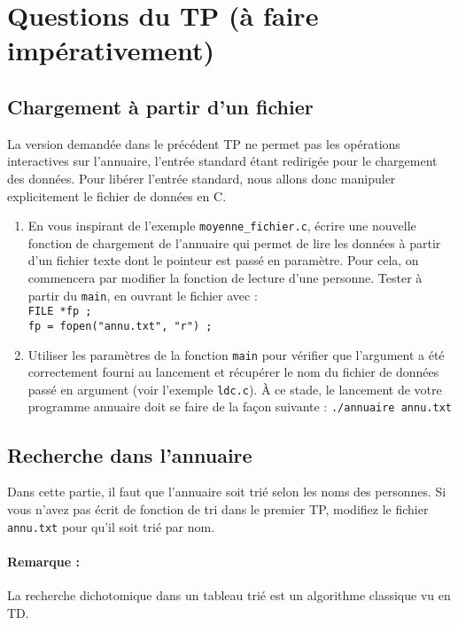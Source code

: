 \documentclass[final, pdftex, a4paper, openbib, ]{article}
\begin{document}
\section{Questions du TP \large (à faire impérativement)}

\subsection{Chargement à partir d'un fichier}

La version demandée dans le précédent TP ne permet pas les opérations interactives sur l'annuaire, l'entrée standard étant redirigée pour le chargement des données. Pour libérer l'entrée standard, nous allons donc manipuler explicitement le fichier de données en C.

\begin{enumerate}
	\item  En vous inspirant de l'exemple \texttt{moyenne\_fichier.c}, écrire une nouvelle fonction de chargement de l'annuaire qui permet de lire les données à partir d'un fichier texte dont le pointeur est passé en paramètre. Pour cela, on commencera par modifier la
	fonction de lecture d'une personne. Tester à partir du \texttt{main}, en ouvrant le fichier
	avec : \\
	\texttt{FILE *fp ;}\\
	\texttt{fp = fopen("annu.txt", "r") ;}
	
	\item Utiliser les paramètres de la fonction \texttt{main} pour vérifier que l'argument a été correctement fourni au lancement et récupérer le nom du fichier de données passé en argument (voir l'exemple \texttt{ldc.c}). À ce stade, le lancement de votre programme annuaire doit se faire de la façon suivante : \texttt{./annuaire annu.txt}	
\end{enumerate}


\subsection{Recherche dans l'annuaire}
Dans cette partie, il faut que l'annuaire soit trié selon les noms des personnes. Si vous
n'avez pas écrit de fonction de tri dans le premier TP, modifiez le fichier \texttt{annu.txt} pour qu'il soit trié par nom.
\paragraph{Remarque :} La recherche dichotomique dans un tableau trié est un algorithme classique vu en TD.
\end{document}
